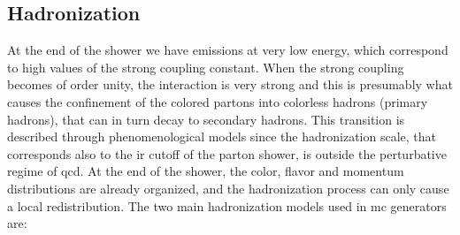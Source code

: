 \subsection{Hadronization}

At the end of the shower we have emissions at very low energy, which correspond to high values of the strong coupling constant. 
When the strong coupling becomes of order unity, the interaction is very strong and this is presumably what causes the confinement of the colored partons into colorless hadrons (primary hadrons), 
that can in turn decay to secondary hadrons. This transition is described through phenomenological models since the hadronization scale, that corresponds also to the \gls{ir} cutoff of the parton shower, is outside the perturbative regime of \gls{qcd}. At the end of the shower, the color, flavor and momentum distributions are already organized, and the hadronization process can only cause a local redistribution.
The two main hadronization models used in \gls{mc} generators are:

